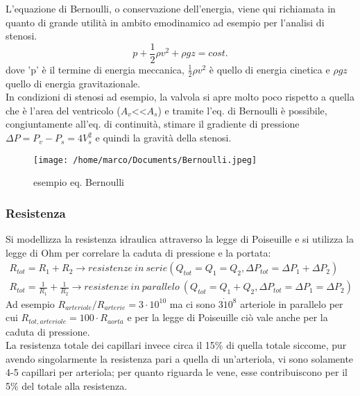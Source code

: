 \documentclass[10pt]{article}
\begin{document}
 L'equazione di Bernoulli, o conservazione dell'energia, viene qui richiamata in quanto di grande utilità in ambito emodinamico ad esempio per l'analisi di stenosi.
 \begin{equation}
     p + \frac{1}{2} \rho v^2 + \rho g z= cost.
 \end{equation}
 dove 'p' è il termine di energia meccanica, $\frac{1}{2} \rho v^2$ è quello di energia cinetica e $\rho g z$ quello di energia gravitazionale.\\
 In condizioni di stenosi ad esempio, la valvola si apre molto poco rispetto a quella che è l'area del ventricolo ($A_v$<<$A_s$) e tramite l'eq. di Bernoulli è possibile, congiuntamente all'eq. di continuità, stimare il gradiente di pressione $\Delta P=P_v-P_s=4V_s^2$ e quindi la gravità della stenosi.  
 
 \begin{figure}[h!]
\centering
\texttt{[image: /home/marco/Documents/Bernoulli.jpeg]}
\caption{esempio eq. Bernoulli}
\label{fig:Bernoulli}
\end{figure}

\subsubsection{Resistenza}

Si modellizza la resistenza idraulica attraverso la legge di Poiseuille e si utilizza la legge di Ohm per correlare la caduta di pressione e la portata:
\begin{equation}
    \begin{split}
        R_{tot}=R_1+R_2 \rightarrow resistenze\ in\ serie(Q_{tot}=Q_1=Q_2,\Delta P_{tot}=\Delta P_1+ \Delta P_2)\\
        R_{tot}=\frac{1}{R_1}+\frac{1}{R_2} \rightarrow resistenze\ in\ parallelo\ (Q_{tot}=Q_1+Q_2,\Delta P_{tot}=\Delta P_1= \Delta P_2)
    \end{split} 
\end{equation}
Ad esempio $R_{arteriole}/R_{arterie}=3 \cdot 10^10$ ma ci sono $3 \dot 10^8$ arteriole in parallelo per cui $R_{tot,arteriole}=100 \cdot R_{aorta}$ e per la legge di Poiseuille ciò vale anche per la caduta di pressione.\\
La resistenza totale dei capillari invece circa il 15\% di quella totale siccome, pur avendo singolarmente la resistenza pari a quella di un'arteriola, vi sono solamente 4-5 capillari per arteriola; per quanto riguarda le vene, esse contribuiscono per il 5\% del totale alla resistenza.
\end{document}
